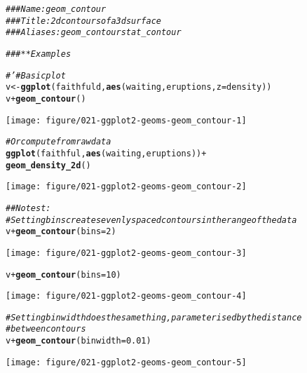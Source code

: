 \documentclass[a4paper,titlepage]{tufte-handout}\usepackage[]{graphicx}\usepackage[]{color}
\makeatletter
\def\maxwidth{ %
  \ifdim\Gin@nat@width>\linewidth
    \linewidth
  \else
    \Gin@nat@width
  \fi
}
\newcommand{\hlnum}[1]{\textcolor[rgb]{0.686,0.059,0.569}{#1}}%
\newcommand{\hlcom}[1]{\textcolor[rgb]{0.678,0.584,0.686}{\textit{#1}}}%
\newcommand{\hlopt}[1]{\textcolor[rgb]{0,0,0}{#1}}%
\newcommand{\hlstd}[1]{\textcolor[rgb]{0.345,0.345,0.345}{#1}}%
\newcommand{\hlkwb}[1]{\textcolor[rgb]{0.69,0.353,0.396}{#1}}%
\newcommand{\hlkwc}[1]{\textcolor[rgb]{0.333,0.667,0.333}{#1}}%
\newcommand{\hlkwd}[1]{\textcolor[rgb]{0.737,0.353,0.396}{\textbf{#1}}}%
\newenvironment{kframe}{%
 \def\at@end@of@kframe{}%
 \ifinner\ifhmode%
  \def\at@end@of@kframe{\end{minipage}}%
  \begin{minipage}{\columnwidth}%
 \fi\fi%
 \def\FrameCommand##1{\hskip\@totalleftmargin \hskip-\fboxsep
 \colorbox{shadecolor}{##1}\hskip-\fboxsep
     \hskip-\linewidth \hskip-\@totalleftmargin \hskip\columnwidth}%
 \MakeFramed {\advance\hsize-\width
   \@totalleftmargin\z@ \linewidth\hsize
   \@setminipage}}%
 {\par\unskip\endMakeFramed%
 \at@end@of@kframe}
\newenvironment{knitrout}{}{} %
\makeatother
\begin{document}
\begin{knitrout}
\color{fgcolor}\begin{kframe}
\begin{alltt}
\hlcom{### Name: geom_contour}
\hlcom{### Title: 2d contours of a 3d surface}
\hlcom{### Aliases: geom_contour stat_contour}

\hlcom{### ** Examples}

\hlcom{#' # Basic plot}
\hlstd{v} \hlkwb{<-} \hlkwd{ggplot}\hlstd{(faithfuld,} \hlkwd{aes}\hlstd{(waiting, eruptions,} \hlkwc{z} \hlstd{= density))}
\hlstd{v} \hlopt{+} \hlkwd{geom_contour}\hlstd{()}
\end{alltt}
\end{kframe}
\texttt{[image: figure/021-ggplot2-geoms-geom\_contour-1]} 
\begin{kframe}\begin{alltt}
\hlcom{# Or compute from raw data}
\hlkwd{ggplot}\hlstd{(faithful,} \hlkwd{aes}\hlstd{(waiting, eruptions))} \hlopt{+}
  \hlkwd{geom_density_2d}\hlstd{()}
\end{alltt}
\end{kframe}
\texttt{[image: figure/021-ggplot2-geoms-geom\_contour-2]} 
\begin{kframe}\begin{alltt}
\hlcom{## No test: }
\hlcom{# Setting bins creates evenly spaced contours in the range of the data}
\hlstd{v} \hlopt{+} \hlkwd{geom_contour}\hlstd{(}\hlkwc{bins} \hlstd{=} \hlnum{2}\hlstd{)}
\end{alltt}
\end{kframe}
\texttt{[image: figure/021-ggplot2-geoms-geom\_contour-3]} 
\begin{kframe}\begin{alltt}
\hlstd{v} \hlopt{+} \hlkwd{geom_contour}\hlstd{(}\hlkwc{bins} \hlstd{=} \hlnum{10}\hlstd{)}
\end{alltt}
\end{kframe}
\texttt{[image: figure/021-ggplot2-geoms-geom\_contour-4]} 
\begin{kframe}\begin{alltt}
\hlcom{# Setting binwidth does the same thing, parameterised by the distance}
\hlcom{# between contours}
\hlstd{v} \hlopt{+} \hlkwd{geom_contour}\hlstd{(}\hlkwc{binwidth} \hlstd{=} \hlnum{0.01}\hlstd{)}
\end{alltt}
\end{kframe}
\texttt{[image: figure/021-ggplot2-geoms-geom\_contour-5]} 

\end{knitrout}
\end{document}
